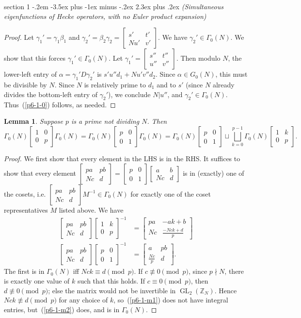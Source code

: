 \documentclass[12pt]{article}
\makeatletter
\theoremstyle{norm}
\newtheorem{lem}[thm]{Lemma}
\newcommand{\Z}[0]{\mathbb{Z}}
\newcommand{\al}[0]{\alpha}
\newcommand{\be}[0]{\beta}
\newcommand{\ga}[0]{\gamma}
\newcommand{\Ga}[0]{\Gamma}
\newcommand{\GL}{\operatorname{GL}}
\newcommand{\matt}[4]{
\left[
\begin{matrix}
{#1}&{#2}\\
{#3}&{#4}
\end{matrix}
\right]}
\newcommand{\smatt}[4]{
\left[
\begin{smallmatrix}
{#1}&{#2}\\
{#3}&{#4}
\end{smallmatrix}
\right]}
\newcommand{\nequiv}[0]{\not\equiv}
\newenvironment{problem}{\@startsection
       {section}
       {1}
       {-.2em}
       {-3.5ex plus -1ex minus -.2ex}
       {2.3ex plus .2ex}
       {\pagebreak[3]%
       \large\bf\noindent{Problem }
       }
       }
       {%
       }
\makeatother
\begin{document}
\begin{problem}{\it (Simultaneous eigenfunctions of Hecke operators, with no Euler product expansion)}
\begin{proof}
Let $\ga_1'=\ga_1\be_1$ and $\ga_2'=\be_2\ga_2=\smatt{s'}{t'}{Nu'}{v'}$. 
We have $\ga_2'\in \Ga_0(N)$. We show that this forces $\ga_1'\in \Ga_0(N)$. Let $\ga_1'=\smatt{s''}{t''}{u''}{v''}$. Then modulo $N$, the lower-left entry of $\al=\ga_1'D\ga_2'$ is $s'u''d_1+Nu'v''d_2$. Since $\al\in G_0(N)$, this must be divisible by $N$. Since $N$ is relatively prime to $d_1$ and to $s'$ (since $N$ already divides the bottom-left entry of $\ga_2'$), we conclude $N|u''$, and $\ga_2'\in \Ga_0(N)$. Thus~(\ref{p6-1-0}) follows, as needed.
\end{proof}
\begin{lem}\label{p6-1-2}
Suppose $p$ is a prime not dividing $N$. Then
\[
\Ga_0(N)
\matt{1}00{p}
\Ga_0(N)=
\Ga_0(N)
\matt{p}00{1}
\Ga_0(N)=
\Ga_0(N)\matt p001 \sqcup \bigsqcup_{k=0}^{p-1}\Ga_0(N)\matt 1k0p.
\]
\end{lem}
\begin{proof}
We first show that every element in the LHS is in the RHS. It suffices to show that every element $\smatt{pa}{pb}{Nc}{d}=\smatt p001\smatt ab{Nc}d$ is in (exactly) one of the cosets, i.e. $\smatt{pa}{pb}{Nc}{d}M^{-1}\in \Ga_0(N)$ for exactly one of the coset representatives $M$ listed above. We have
\begin{align}
\label{p6-1-m1}
\matt{pa}{pb}{Nc}{d}\matt 1k0p^{-1}&=\matt{pa}{-ak+b}{Nc}{\frac{-Nck+d}p}\\
\label{p6-1-m2}
\matt{pa}{pb}{Nc}d\matt p001^{-1}&=\matt{a}{pb}{\frac{Nc}p}d.
\end{align}
The first is in $\Ga_0(N)$ iff $Nck\equiv d\pmod p$. If $c\nequiv 0\pmod p$, since $p\nmid N$, there is exactly one value of $k$ such that this holds. %
If $c\equiv 0\pmod p$, then $d\nequiv 0\pmod p$; else the matrix would not be invertible in $\GL_2(\Z_N)$. Hence $Nck\nequiv d\pmod p$ for any choice of $k$, so~(\ref{p6-1-m1}) does not have integral entries, but~(\ref{p6-1-m2}) does, and is in $\Ga_0(N)$.


\end{proof}
\end{problem}
\end{document}

